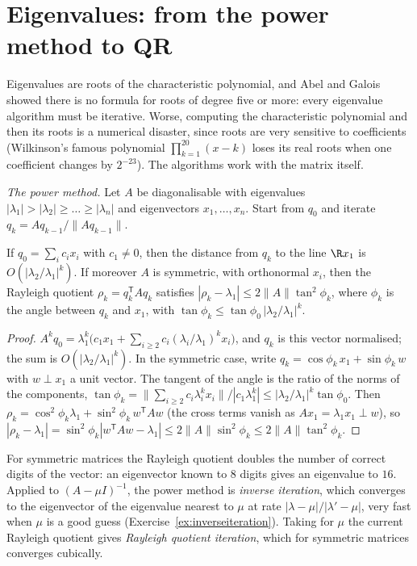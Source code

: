 \section{Eigenvalues: from the power method to QR}\label{sec:eigen}

Eigenvalues are roots of the characteristic polynomial, and Abel and Galois showed there is no formula for roots of degree five or more: every
eigenvalue algorithm must be iterative. Worse, computing the characteristic polynomial and then its roots is a numerical disaster, since roots are
very sensitive to coefficients (Wilkinson's famous polynomial $\prod_{k=1}^{20}(x-k)$ loses its real roots when one coefficient changes by $2^{-23}$). The
algorithms work with the matrix itself.

\emph{The power method.} Let $A$ be diagonalisable with eigenvalues $|\lambda_1|>|\lambda_2|\ge\dots\ge|\lambda_n|$ and eigenvectors $x_1,\dots,x_n$. Start
from $q_0$ and iterate $q_{k}=Aq_{k-1}/\|Aq_{k-1}\|$.

\begin{proposition}\label{prop:power}
If $q_0=\sum_ic_ix_i$ with $c_1\ne0$, then the distance from $q_k$ to the line $\R x_1$ is $O(|\lambda_2/\lambda_1|^k)$. If moreover $A$ is symmetric, with
orthonormal $x_i$, then the Rayleigh quotient $\rho_k=q_k^{\mathsf T}Aq_k$ satisfies $|\rho_k-\lambda_1|\le2\|A\|\tan^2\phi_k$, where $\phi_k$ is the angle
between $q_k$ and $x_1$, with $\tan\phi_k\le\tan\phi_0\,|\lambda_2/\lambda_1|^k$.
\end{proposition}
\begin{proof}
$A^kq_0=\lambda_1^k\bigl(c_1x_1+\sum_{i\ge2}c_i(\lambda_i/\lambda_1)^kx_i\bigr)$, and $q_k$ is this vector normalised; the sum is $O(|\lambda_2/\lambda_1|^k)$.
In the symmetric case, write $q_k=\cos\phi_k\,x_1+\sin\phi_k\,w$ with $w\perp x_1$ a unit vector. The tangent of the angle is the ratio of the
norms of the components, $\tan\phi_k=\|\sum_{i\ge2}c_i\lambda_i^kx_i\|/|c_1\lambda_1^k|\le|\lambda_2/\lambda_1|^k\tan\phi_0$. Then
$\rho_k=\cos^2\phi_k\lambda_1+\sin^2\phi_k\,w^{\mathsf T}Aw$ (the cross terms vanish as $Ax_1=\lambda_1x_1\perp w$), so
$|\rho_k-\lambda_1|=\sin^2\phi_k|w^{\mathsf T}Aw-\lambda_1|\le2\|A\|\sin^2\phi_k\le2\|A\|\tan^2\phi_k$.
\end{proof}

For symmetric matrices the Rayleigh quotient doubles the number of correct digits of the vector: an eigenvector known to $8$ digits gives an eigenvalue
to $16$. Applied to $(A-\mu I)^{-1}$, the power method is \emph{inverse iteration}, which converges to the eigenvector of the eigenvalue nearest to $\mu$ at
rate $|\lambda-\mu|/|\lambda'-\mu|$, very fast when $\mu$ is a good guess (Exercise~\ref{ex:inverseiteration}). Taking for $\mu$ the current Rayleigh quotient
gives \emph{Rayleigh quotient iteration}, which for symmetric matrices converges cubically.

